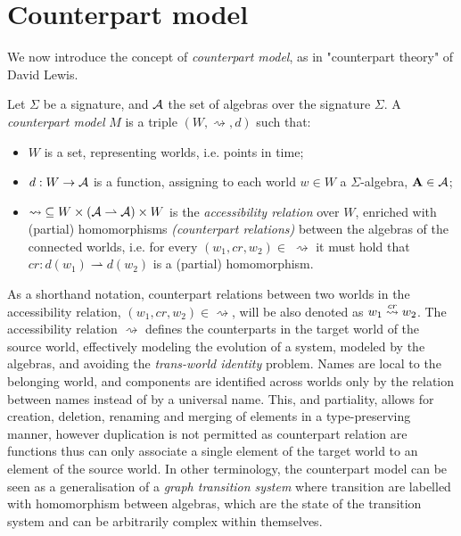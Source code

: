 \section{Counterpart model}

We now introduce the concept of \emph{counterpart model}, as in "counterpart theory" of David Lewis.

\begin{definition}
Let $\Sigma$ be a signature, and $\mathcal{A}$ the set of algebras over the signature $\Sigma$. A \emph{counterpart
model} $M$ is a triple $(W, \rightsquigarrow, d)$ such that:
\begin{itemize}
  \item $W$ is a set, representing worlds, i.e. points in time;
  \item $d : W \to \mathcal{A}$ is a function, assigning to each world $w \in W$ a $\Sigma$-algebra, $\mathbf{A} \in
    \mathcal{A}$;
  \item $\rightsquigarrow\;\subseteq W \times (\mathcal{A} \rightharpoonup \mathcal{A}) \times W$ is the
    \emph{accessibility relation} over $W$, enriched with (partial) homomorphisms \emph{(counterpart relations)} between
  the algebras of the connected worlds, i.e. for every $(w_1, cr, w_2) \in\;\rightsquigarrow$ it must hold that $cr :
  d(w_1) \rightharpoonup d(w_2)$ is a (partial) homomorphism.
\end{itemize}
\end{definition}

As a shorthand notation, counterpart relations between two worlds in the accessibility relation, $(w_1, cr, w_2) \in
\rightsquigarrow$, will be also denoted as $w_1 \overset{cr}{\rightsquigarrow} w_2$.
The accessibility relation $\rightsquigarrow$ defines the counterparts in the target world of the source world,
effectively modeling the evolution of a system, modeled by the algebras, and avoiding the \emph{trans-world identity}
problem. Names are local to the belonging world, and components are identified across worlds only by the relation
between names instead of by a universal name. This, and partiality, allows for creation, deletion, renaming and merging
of elements in a type-preserving manner, however duplication is not permitted as counterpart relation are functions thus
can only associate a single element of the target world to an element of the source world.
In other terminology, the counterpart model can be seen as a generalisation of a \emph{graph transition system} where
transition are labelled with homomorphism between algebras, which are the state of the transition system and can be
arbitrarily complex within themselves.

